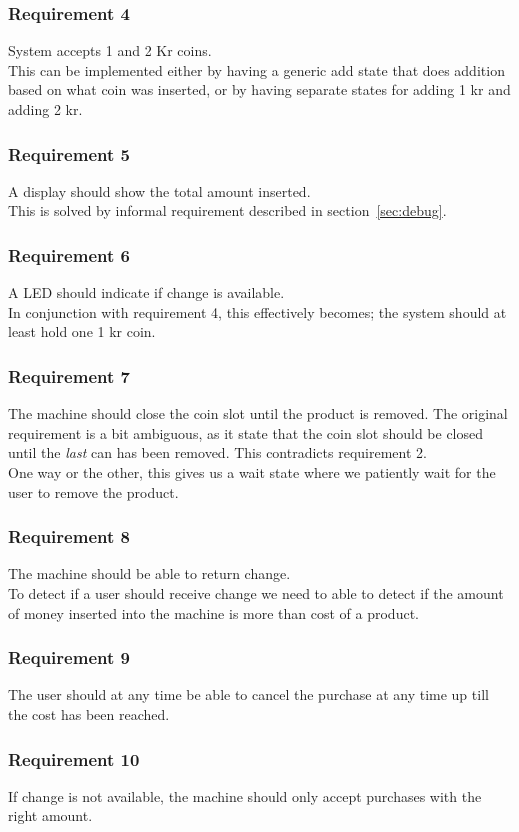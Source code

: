\subsubsection*{Requirement 4}
System accepts 1 and 2 Kr coins.\\
This can be implemented either by having a generic add state that does addition based on what coin was inserted, or by having separate states for adding 1 kr and adding 2 kr.

\subsubsection*{Requirement 5}
A display should show the total amount inserted.\\
This is solved by informal requirement described in section~\ref{sec:debug}. 

\subsubsection*{Requirement 6}
A LED should indicate if change is available.\\
In conjunction with requirement 4, this effectively becomes; the system should at least hold one 1 kr coin. 

\subsubsection*{Requirement 7}
The machine should close the coin slot until the product is removed. The original requirement is a bit ambiguous, as it state that the coin slot should be closed until the \emph{last} can has been removed. This contradicts requirement 2.\\
One way or the other, this gives us a wait state where we patiently wait for the user to remove the product.

\subsubsection*{Requirement 8}
The machine should be able to return change.\\
To detect if a user should receive change we need to able to detect if the amount of money inserted into the machine is more than cost of a product.

\subsubsection*{Requirement 9}
The user should at any time be able to cancel the purchase at any time up till the cost has been reached.\\

\subsubsection*{Requirement 10}
If change is not available, the machine should only accept purchases with the right amount.